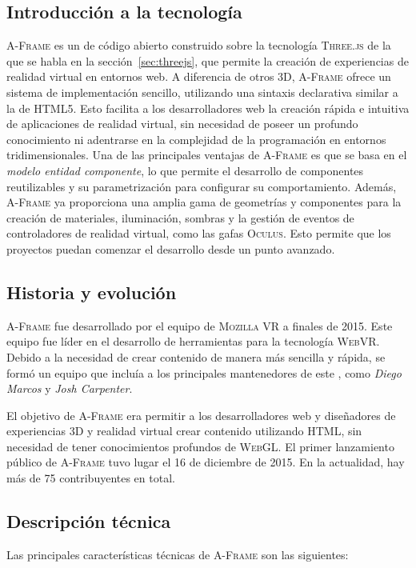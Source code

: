 \documentclass[a4paper, 11pt]{book}
\begin{document}
\subsection{Introducción a la tecnología}
\textsc{A-Frame}\cite{aframedocs} es un \emph{} de código abierto construido sobre la tecnología \textsc{Three.js} de la que se habla en la sección~\ref{sec:threejs}, que permite la creación de experiencias de realidad virtual en entornos web. A diferencia de otros \emph{} \textsc{3D}, \textsc{A-Frame} ofrece un sistema de implementación sencillo, utilizando una sintaxis declarativa similar a la de \textsc{HTML5}. 
Esto facilita a los desarrolladores web la creación rápida e intuitiva de aplicaciones de realidad virtual, sin necesidad de poseer un profundo conocimiento ni adentrarse en la complejidad de la programación en entornos tridimensionales.
Una de las principales ventajas de \textsc{A-Frame} es que se basa en el \emph{modelo entidad componente}, lo que permite el desarrollo de componentes reutilizables y su parametrización para configurar su comportamiento.
Además, \textsc{A-Frame} ya proporciona una amplia gama de geometrías y componentes para la creación de materiales, iluminación, sombras y la gestión de eventos de controladores de realidad virtual, como las gafas \textsc{Oculus}. Esto permite que los proyectos puedan comenzar el desarrollo desde un punto avanzado.

\subsection{Historia y evolución}
\textsc{A-Frame} fue desarrollado por el equipo de \textsc{Mozilla VR} a finales de 2015. Este equipo fue líder en el desarrollo de herramientas para la tecnología \textsc{WebVR}. Debido a la necesidad de crear contenido de manera más sencilla y rápida, se formó un equipo que incluía a los principales mantenedores de este \emph{}, como \emph{Diego Marcos} y \emph{Josh Carpenter}. 

El objetivo de \textsc{A-Frame} era permitir a los desarrolladores web y diseñadores de experiencias \textsc{3D} y realidad virtual crear contenido utilizando \textsc{HTML}, sin necesidad de tener conocimientos profundos de \textsc{\gls{WebGL}}. El primer lanzamiento público de \textsc{A-Frame} tuvo lugar el 16 de diciembre de 2015. En la actualidad, hay más de 75 contribuyentes en total.
\subsection{Descripción técnica}
Las principales características técnicas de \textsc{A-Frame} son las siguientes:
\end{document}
